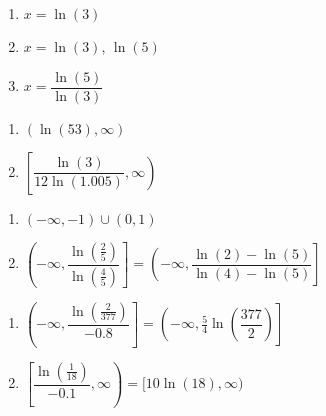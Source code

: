 \begin{multicols}{3}
\begin{enumerate}
\setcounter{enumi}{\value{HW}}

\item $x=\ln(3)$  
\item $x=\ln(3)$, $\ln(5)$  
\item $x=\dfrac{\ln(5)}{\ln(3)}$


\setcounter{HW}{\value{enumi}}
\end{enumerate}
\end{multicols}

\begin{multicols}{2} 
\begin{enumerate}
\setcounter{enumi}{\value{HW}}

\item $(\ln(53), \infty)$ \vphantom{$\left[\dfrac{\ln(3)}{12\ln(1.005)}, \infty\right)$}
\item $\left[\dfrac{\ln(3)}{12\ln(1.005)}, \infty\right)$

\setcounter{HW}{\value{enumi}}
\end{enumerate}
\end{multicols}

\begin{multicols}{2} 
\begin{enumerate}
\setcounter{enumi}{\value{HW}}

\item $(-\infty, -1) \cup (0, 1)$ \vphantom{$\left(-\infty, \dfrac{\ln\left(\frac{2}{5}\right)}{\ln\left(\frac{4}{5}\right)} \right] = \left(-\infty, \dfrac{\ln(2)-\ln(5)}{\ln(4)-\ln(5)} \right]$} 

\item $\left(-\infty, \dfrac{\ln\left(\frac{2}{5}\right)}{\ln\left(\frac{4}{5}\right)} \right] = \left(-\infty, \dfrac{\ln(2)-\ln(5)}{\ln(4)-\ln(5)} \right]$

\setcounter{HW}{\value{enumi}}
\end{enumerate}
\end{multicols}

\begin{multicols}{2} 
\begin{enumerate}
\setcounter{enumi}{\value{HW}}

\item $\left(-\infty, \dfrac{\ln\left(\frac{2}{377}\right)}{-0.8} \right] = \left(-\infty, \frac{5}{4}\ln\left(\dfrac{377}{2}\right) \right]$
\item $\left[\dfrac{\ln\left(\frac{1}{18}\right)}{-0.1}, \infty\right) = [10\ln(18), \infty)$

\setcounter{HW}{\value{enumi}}
\end{enumerate}
\end{multicols}


